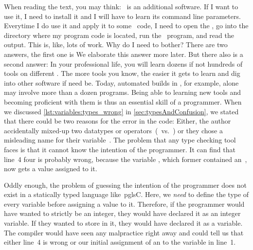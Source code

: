 %
When reading the text, you may think:
\mypy\ is an additional software.
If I want to use it, I need to install it and I will have to learn its command line parameters.
Everytime I do use it and apply it to some \python\ code, I need to open the , go into the directory where my program code is located, run the \mypy\ program, and read the output.
This is, like, lots of work.
Why do I need to bother?
There are two answers, the first one is 
We elaborate this answer more later.
But there also is a second answer:%
%
%
%
In your professional life, you will learn dozens if not hundreds of tools on different .
The more tools you know, the easier it gets to learn and dig into other software if need be.
Today, automated builds in , for example, alone may involve more than a dozen programs.
Being able to learning new tools and becoming proficient with them is thus an essential skill of a programmer.%
%
\endhsection%
%
%
\label{sec:varTypeHints}%
%
When we discussed \cref{lst:variables:types_wrong} in \cref{sec:typesAndConfusion}, we stated that there could be two reasons for the error in the code:
Either, the author accidentally mixed-up two datatypes or operators~(\pythonilIdx{/}~vs.~\pythonilIdx{//}) or they chose a misleading name for their variable~.
The problem that any type checking tool faces is that it cannot know the intention of the programmer.
It can find that line~4 four is probably wrong, because the variable , which former contained an~, now gets a  value assigned to it.

Oddly enough, the problem of guessing the intention of the programmer does not exist in a statically typed language like~pgls{C}.
Here, we \emph{need} to define the type of every variable before assigning a value to it.
Therefore, if the programmer would have wanted  to strictly be an integer, they would have declared it as an integer variable.
If they wanted to store  in it, they would have declared it as a  variable.
The compiler would have seen any malpractice right away and could tell us that either line~4 is wrong or our initial assignment of an  to the variable in line~1.

